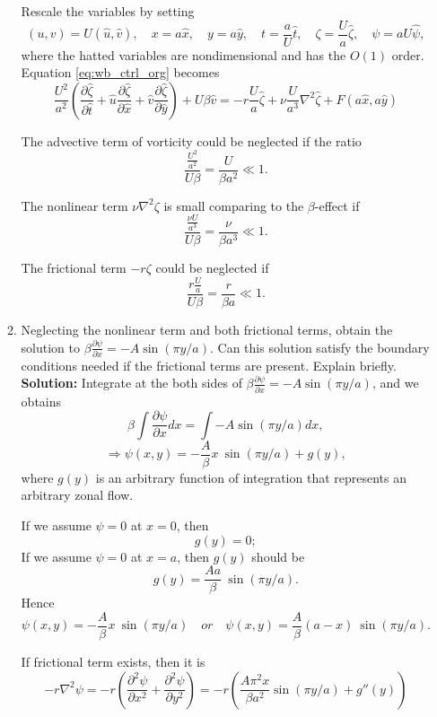 \documentclass[a4paper]{article}
\begin{document}
\begin{enumerate}[label=\textbf{\arabic*.}]
\begin{enumerate}[label=\textbf{(\alph*)}]
		Rescale the variables by setting
		$$(u,v)=U(\hat{u},\hat{v}), \quad x=a\hat{x},\quad y=a\hat{y},\quad t=\frac{a}{U}\hat{t}, \quad \zeta = \frac{U}{a}\hat{\zeta}, \quad \psi=aU \hat{\psi}, $$
		where the hatted variables are nondimensional and has the $O(1)$ order. Equation \eqref{eq:wb_ctrl_org} becomes
		\begin{equation}\label{eq:wb_ctrl_rescale}
			\frac{U^2}{a^2}\left(\frac { \partial \hat{\zeta} } { \partial \hat{t} } + \hat{u}\frac{\partial \hat{\zeta}}{\partial \hat{x}} +  \hat{v}\frac{\partial \hat{\zeta}}{\partial \hat{y}}\right) + U \beta \hat{v} = -r\frac{U}{a}\hat{\zeta} + \nu \frac{U}{a^3} \nabla^{2}\hat{\zeta} +F(a\hat{x},a\hat{y})
		\end{equation}
		
		The advective term of vorticity could be neglected if the ratio
		$$\frac{\frac{U^2}{a^2}}{U\beta}=\frac{U}{\beta a^2}\ll 1.$$
	
		The nonlinear term $\nu \nabla ^ { 2} \zeta$ is small comparing to the $\beta$-effect if
		$$\dfrac{\frac{\nu U}{a^3}}{U\beta} =\frac{\nu }{\beta a^3}\ll 1.$$
		
		The frictional term $-r\zeta$ could be neglected if
		$$\frac{r\frac{U}{a}}{U\beta}=\frac{r}{\beta a}\ll 1.$$ 
		
		\item Neglecting the nonlinear term and both frictional terms, obtain the solution to $\beta \frac{\partial \psi}{\partial x} = -A\sin (\pi y/a).$
Can this solution satisfy the boundary conditions needed
if the frictional terms are present. Explain briefly.\\
		\textbf{Solution:}
		Integrate at the both sides of $\beta \frac{\partial \psi}{\partial x} = -A\sin (\pi y/a)$, and we obtains
		$$\beta \int\frac{\partial \psi}{\partial x}dx = \int -A\sin (\pi y/a)dx,$$
		$$\Longrightarrow \psi(x,y) =  -\frac{A}{\beta}x~\sin (\pi y/a)+g(y),$$
		where $g(y)$ is an arbitrary function of integration that represents an arbitrary zonal flow.
		
		If we assume $\psi=0$ at $x=0$, then $$g(y)=0;$$
		If we assume $\psi=0$ at $x=a$, then $g(y)$ should be $$g(y)=\frac{Aa}{\beta}~\sin (\pi y/a).$$
		Hence
		$$\psi(x,y) =  -\frac{A}{\beta}x~\sin (\pi y/a) \quad or \quad \psi(x,y) =  \frac{A}{\beta}(a-x)~\sin (\pi y/a).$$
		
		If frictional term exists, then it is 
		$$-r\nabla^2\psi = -r\left(\frac{\partial^2 \psi}{\partial x^2} + \frac{\partial^2 \psi}{\partial y^2}\right)=-r\left( \frac{A\pi^2x}{\beta a^2 }\sin (\pi y/a) + g''(y)\right)$$
		

\end{enumerate}
\end{enumerate}
\end{document}
